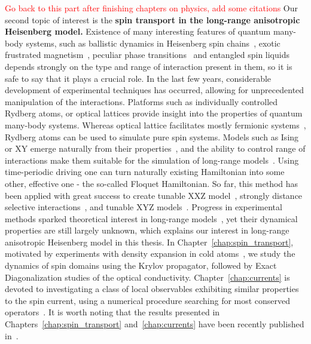 \textcolor{red}{Go back to this part after finishing chapters on physics, add some citations}
Our second topic of interest is the \textbf{spin transport in the long-range anisotropic Heisenberg model.}
Existence of many interesting features of quantum many-body systems, such as ballistic dynamics in Heisenberg spin
chains~\autocite{Zotos1997,Bertini2021},
exotic frustrated magnetism~\autocite{Nisoli2017}, peculiar phase transitions~\autocite{Sandvik2010a,Yang2021}
and entangled spin liquids~\autocite{Balents2010} depends strongly
on the type and range of interaction present in them, so it is safe to say that it plays a crucial role.
In the last few years, considerable development of experimental techniques has
occurred, allowing for unprecedented manipulation of the interactions.
Platforms such as individually controlled Rydberg atoms, or optical lattices provide insight into the
properties of quantum many-body systems. Whereas optical lattice facilitates mostly fermionic
systems~\autocite{Bakr2009, Greif2016, Parsons2015, Boll2016}, Rydberg atoms can be used to simulate pure spin systems.
Models such as Ising or XY emerge naturally from their properties~\autocite{Browaeys2020}, and the ability to control
range of interactions make them suitable for the simulation of long-range models~\autocite{Borish2020}. Using time-periodic
driving one can turn naturally existing Hamiltonian into some other, effective one - the so-called Floquet Hamiltonian.
So far, this method has been applied with great success to create tunable XXZ model~\autocite{Scholl2022}, strongly distance
selective interactions~\autocite{Hollerith2022}, and tunable XYZ models~\autocite{Steinert2022, Geier2021}.
Progress in experimental methods sparked theoretical interest in long-range
models~\autocite{Richerme2014,Jurcevic2014,Hauke2013,Foss-Feig2015,Maghrebi2016,Lepori2017,Frerot2017,Vanderstraeten2018,Cevolani2018,Kloss2019,Ren2020,Bulchandani2022a},
yet their dynamical properties are still largely unknown, which explains our interest in long-range anisotropic
Heisenberg model in this thesis.
In Chapter~\ref{chap:spin_transport}, motivated by experiments with density expansion in cold atoms~\autocite{Ronzheimer2013,Vidmar2013,Neyenhuis2017},
we study the dynamics of spin domains using the Krylov propagator, followed by Exact Diagonalization studies of the optical conductivity.
Chapter~\ref{chap:currents} is devoted to investigating a class of local observables exhibiting similar properties
to the spin current, using a numerical procedure searching for most conserved operators~\autocite{Mierzejewski2015a}.
It is worth noting that the results presented in Chapters~\ref{chap:spin_transport} and~\ref{chap:currents} have
been recently published in~\textcite{Mierzejewski2023}.


